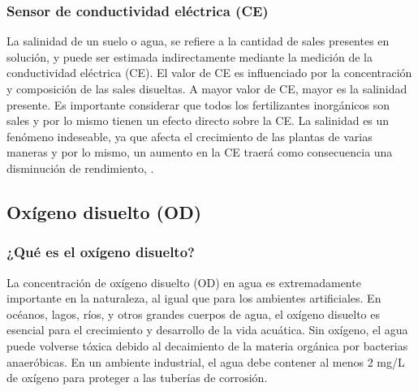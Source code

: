 \subsubsection{Sensor de conductividad eléctrica (CE) }
La salinidad de un suelo o agua, se refiere a la cantidad de sales presentes en solución, y puede ser estimada indirectamente mediante la medición de la conductividad eléctrica (CE). 
El valor de CE es influenciado por la concentración y composición de las sales disueltas.
A mayor valor de CE, mayor es la salinidad presente. 
Es importante considerar que todos los fertilizantes inorgánicos son sales y por lo mismo tienen un efecto directo sobre la CE.
La salinidad es un fenómeno indeseable, ya que afecta el crecimiento de las plantas de varias maneras y por lo mismo, un aumento en la CE traerá como consecuencia una disminución de rendimiento, \cite{rebolledo_v_conductividad_2017}.

\subsection{Oxígeno disuelto (OD)}
\subsubsection{¿Qué es el oxígeno disuelto?}
La concentración de oxígeno disuelto (OD) en agua es extremadamente importante en la naturaleza, al igual que para los ambientes artificiales. 
En océanos, lagos, ríos, y otros grandes cuerpos de agua, el oxígeno disuelto es esencial para el crecimiento y desarrollo de la vida acuática. 
Sin oxígeno, el agua puede volverse tóxica debido al decaimiento de la materia orgánica por bacterias anaeróbicas. 
En un ambiente industrial, el agua debe contener al menos 2 mg/L de oxígeno para proteger a las tuberías de corrosión.  

